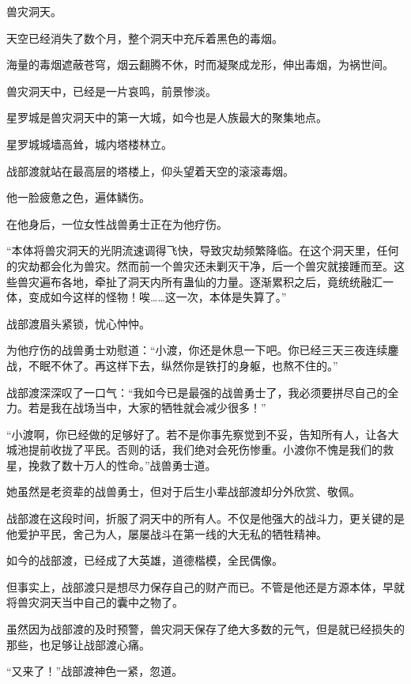 
\begin{this_body}

兽灾洞天。

天空已经消失了数个月，整个洞天中充斥着黑色的毒烟。

海量的毒烟遮蔽苍穹，烟云翻腾不休，时而凝聚成龙形，伸出毒烟，为祸世间。

兽灾洞天中，已经是一片哀鸣，前景惨淡。

星罗城是兽灾洞天中的第一大城，如今也是人族最大的聚集地点。

星罗城城墙高耸，城内塔楼林立。

战部渡就站在最高层的塔楼上，仰头望着天空的滚滚毒烟。

他一脸疲惫之色，遍体鳞伤。

在他身后，一位女性战兽勇士正在为他疗伤。

“本体将兽灾洞天的光阴流速调得飞快，导致灾劫频繁降临。在这个洞天里，任何的灾劫都会化为兽灾。然而前一个兽灾还未剿灭干净，后一个兽灾就接踵而至。这些兽灾遍布各地，牵扯了洞天内所有蛊仙的力量。逐渐累积之后，竟统统融汇一体，变成如今这样的怪物！唉……这一次，本体是失算了。”

战部渡眉头紧锁，忧心忡忡。

为他疗伤的战兽勇士劝慰道：“小渡，你还是休息一下吧。你已经三天三夜连续鏖战，不眠不休了。再这样下去，纵然你是铁打的身躯，也熬不住的。”

战部渡深深叹了一口气：“我如今已是最强的战兽勇士了，我必须要拼尽自己的全力。若是我在战场当中，大家的牺牲就会减少很多！”

“小渡啊，你已经做的足够好了。若不是你事先察觉到不妥，告知所有人，让各大城池提前收拢了平民。否则的话，我们绝对会死伤惨重。小渡你不愧是我们的救星，挽救了数十万人的性命。”战兽勇士道。

她虽然是老资辈的战兽勇士，但对于后生小辈战部渡却分外欣赏、敬佩。

战部渡在这段时间，折服了洞天中的所有人。不仅是他强大的战斗力，更关键的是他爱护平民，舍己为人，屡屡战斗在第一线的大无私的牺牲精神。

如今的战部渡，已经成了大英雄，道德楷模，全民偶像。

但事实上，战部渡只是想尽力保存自己的财产而已。不管是他还是方源本体，早就将兽灾洞天当中自己的囊中之物了。

虽然因为战部渡的及时预警，兽灾洞天保存了绝大多数的元气，但是就已经损失的那些，也足够让战部渡心痛。

“又来了！”战部渡神色一紧，忽道。


\end{this_body}
